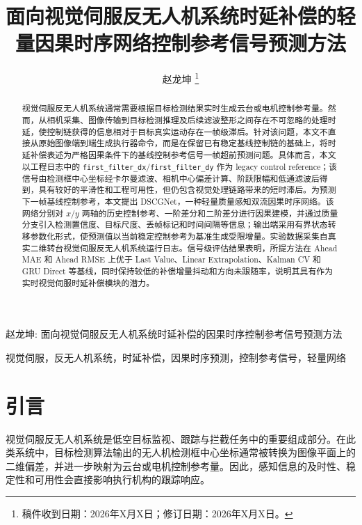 \documentclass[journal]{IEEEtran}
\begin{document}
\title{面向视觉伺服反无人机系统时延补偿的轻量因果时序网络控制参考信号预测方法}

\author{赵龙坤%
\thanks{稿件收到日期：2026年X月X日；修订日期：2026年X月X日。}}

%
{赵龙坤: 面向视觉伺服反无人机系统时延补偿的因果时序控制参考信号预测方法}

\maketitle

\begin{abstract}
视觉伺服反无人机系统通常需要根据目标检测结果实时生成云台或电机控制参考量。然而，从相机采集、图像传输到目标检测推理及后续滤波整形之间存在不可忽略的处理时延，使控制链获得的信息相对于目标真实运动存在一帧级滞后。针对该问题，本文不直接从原始图像端到端生成执行器命令，而是在保留已有稳定基线控制链的基础上，将时延补偿表述为严格因果条件下的基线控制参考信号一帧超前预测问题。具体而言，本文以工程日志中的 \texttt{first\_filter\_dx}/\texttt{first\_filter\_dy} 作为 legacy control reference；该信号由检测框中心坐标经卡尔曼滤波、相机中心偏差计算、阶跃限幅和低通滤波后得到，具有较好的平滑性和工程可用性，但仍包含视觉处理链路带来的短时滞后。为预测下一帧基线控制参考，本文提出 DSCGNet，一种轻量质量感知双流因果时序网络。该网络分别对 $x/y$ 两轴的历史控制参考、一阶差分和二阶差分进行因果建模，并通过质量分支引入检测置信度、目标尺度、丢帧标记和时间间隔等信息；输出端采用有界状态转移参数化形式，使预测值以当前稳定控制参考为基准生成受限增量。实验数据采集自真实二维转台视觉伺服反无人机系统运行日志。信号级评估结果表明，所提方法在 Ahead MAE 和 Ahead RMSE 上优于 Last Value、Linear Extrapolation、Kalman CV 和 GRU Direct 等基线，同时保持较低的补偿增量抖动和方向未跟随率，说明其具有作为实时视觉伺服时延补偿模块的潜力。
\end{abstract}

\begin{IEEEkeywords}
视觉伺服，反无人机系统，时延补偿，因果时序预测，控制参考信号，轻量网络
\end{IEEEkeywords}

\section{引言}
视觉伺服反无人机系统是低空目标监视、跟踪与拦截任务中的重要组成部分\cite{chaumette2006visual,hutchinson1996tutorial,corke2011robotics,shi2021anti}。在此类系统中，目标检测算法输出的无人机检测框中心坐标通常被转换为图像平面上的二维偏差，并进一步映射为云台或电机控制参考量。因此，感知信息的及时性、稳定性和可用性会直接影响执行机构的跟踪响应。
\end{document}
